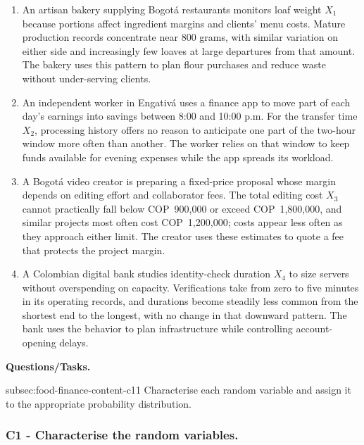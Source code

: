 	\begin{enumerate}
		\item An artisan bakery supplying Bogotá restaurants monitors loaf weight \(X_1\) because portions affect ingredient margins and clients' menu costs. Mature production records concentrate near 800 grams, with similar variation on either side and increasingly few loaves at large departures from that amount. The bakery uses this pattern to plan flour purchases and reduce waste without under-serving clients.
		\item An independent worker in Engativá uses a finance app to move part of each day's earnings into savings between 8:00 and 10:00 p.m. For the transfer time \(X_2\), processing history offers no reason to anticipate one part of the two-hour window more often than another. The worker relies on that window to keep funds available for evening expenses while the app spreads its workload.
		\item A Bogotá video creator is preparing a fixed-price proposal whose margin depends on editing effort and collaborator fees. The total editing cost \(X_3\) cannot practically fall below COP~900,000 or exceed COP~1,800,000, and similar projects most often cost COP~1,200,000; costs appear less often as they approach either limit. The creator uses these estimates to quote a fee that protects the project margin.
		\item A Colombian digital bank studies identity-check duration \(X_4\) to size servers without overspending on capacity. Verifications take from zero to five minutes in its operating records, and durations become steadily less common from the shortest end to the longest, with no change in that downward pattern. The bank uses the behavior to plan infrastructure while controlling account-opening delays.
	\end{enumerate}

	\textbf{Questions/Tasks.}
	\begin{enumerate}
		\CriterionTask
		{subsec:food-finance-content-c1}{1}
		{Characterise each random variable and assign it to the appropriate probability distribution.}
	\end{enumerate}

	\subsubsection*{C1 - Characterise the random variables.}
	\label{subsec:food-finance-content-c1}

